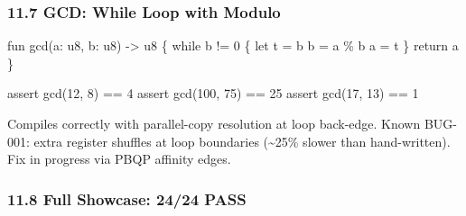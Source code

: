 \documentclass[
  11pt,
]{article}
\newenvironment{Shaded}{\begin{snugshade}}{\end{snugshade}}
\newcommand{\NormalTok}[1]{#1}
\begin{document}
\hypertarget{gcd-while-loop-with-modulo}{%
\subsubsection{11.7 GCD: While Loop with
Modulo}\label{gcd-while-loop-with-modulo}}

\begin{Shaded}
\begin{Highlighting}[]
\NormalTok{fun gcd(a: u8, b: u8) {-}\textgreater{} u8 \{}
\NormalTok{    while b != 0 \{}
\NormalTok{        let t = b}
\NormalTok{        b = a \% b}
\NormalTok{        a = t}
\NormalTok{    \}}
\NormalTok{    return a}
\NormalTok{\}}

\NormalTok{assert gcd(12, 8) == 4}
\NormalTok{assert gcd(100, 75) == 25}
\NormalTok{assert gcd(17, 13) == 1}
\end{Highlighting}
\end{Shaded}

Compiles correctly with parallel-copy resolution at loop back-edge.
Known BUG-001: extra register shuffles at loop boundaries
(\textasciitilde25\% slower than hand-written). Fix in progress via PBQP
affinity edges.

\hypertarget{full-showcase-2424-pass}{%
\subsubsection{11.8 Full Showcase: 24/24
PASS}\label{full-showcase-2424-pass}}
\end{document}
